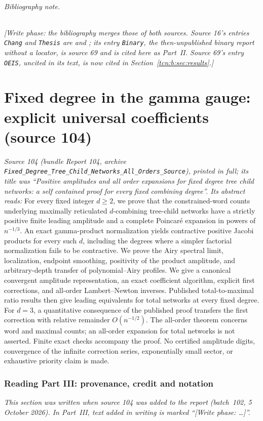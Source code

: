 \documentclass[11pt,letterpaper]{article}
\theoremstyle{remark}
\begin{document}
\paragraph{Bibliography note.} \emph{[Write phase: the bibliography merges those of both sources. Source 16's entries \texttt{Chang} and \texttt{Thesis} are \cite{Chang2024} and \cite{ChangThesis}; its entry \texttt{Binary}, the then-unpublished binary report without a locator, is source 69 and is cited here as Part~II. Source 69's entry \texttt{OEIS}, uncited in its text, is now cited in Section~\ref{tcn:b:sec:results}.]}

\part{Fixed degree in the gamma gauge: explicit universal coefficients (source 104)}\label{tcn:part:f}
\emph{Source 104 (bundle Report 104, archive \textup{\nolinkurl{Fixed_Degree_Tree_Child_Networks_All_Orders_Source}}), printed in full; its title was ``Positive amplitudes and all order expansions for fixed degree tree child networks: a self contained proof for every fixed combining degree''. Its abstract reads:} For every fixed integer $d\ge2$, we prove that the constrained-word counts underlying maximally reticulated $d$-combining tree-child networks have a strictly positive finite leading amplitude and a complete Poincar\'e expansion in powers of $n^{-1/3}$. An exact gamma-product normalization yields contractive positive Jacobi products for every such $d$, including the degrees where a simpler factorial normalization fails to be contractive. We prove the Airy spectral limit, localization, endpoint smoothing, positivity of the product amplitude, and arbitrary-depth transfer of polynomial--Airy profiles. We give a canonical convergent amplitude representation, an exact coefficient algorithm, explicit first corrections, and all-order Lambert--Newton inverses. Published total-to-maximal ratio results then give leading equivalents for total networks at every fixed degree. For $d=3$, a quantitative consequence of the published proof transfers the first correction with relative remainder $O(n^{-1/2})$. The all-order theorem concerns word and maximal counts; an all-order expansion for total networks is not asserted. Finite exact checks accompany the proof. No certified amplitude digits, convergence of the infinite correction series, exponentially small sector, or exhaustive priority claim is made.

\section{Reading Part III: provenance, credit and notation}\label{tcn:f:sec:reading}
\emph{This section was written when source 104 was added to the report (batch~102, 5 October 2026). In Part~III, text added in writing is marked ``[Write phase: \dots]''.}
\end{document}
